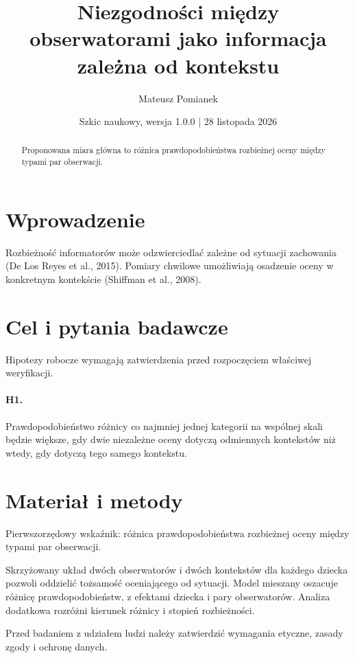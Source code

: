 \documentclass[11pt,a4paper]{article}
\title{Niezgodności między obserwatorami jako informacja zależna od kontekstu}
\author{Mateusz Pomianek}
\date{Szkic naukowy, wersja 1.0.0 | 28 listopada 2026}
\begin{document}
\maketitle

\begin{abstract}

Proponowana miara główna to różnica prawdopodobieństwa rozbieżnej oceny między typami par obserwacji.

\end{abstract}

\section{Wprowadzenie}

Rozbieżność informatorów może odzwierciedlać zależne od sytuacji zachowania (De Los Reyes et al., 2015). Pomiary chwilowe umożliwiają osadzenie oceny w konkretnym kontekście (Shiffman et al., 2008).

\section{Cel i pytania badawcze}

Hipotezy robocze wymagają zatwierdzenia przed rozpoczęciem właściwej weryfikacji.

\paragraph{H1.} Prawdopodobieństwo różnicy co najmniej jednej kategorii na wspólnej skali będzie większe, gdy dwie niezależne oceny dotyczą odmiennych kontekstów niż wtedy, gdy dotyczą tego samego kontekstu.

\section{Materiał i metody}

Pierwszorzędowy wskaźnik: różnica prawdopodobieństwa rozbieżnej oceny między typami par obserwacji.

Skrzyżowany układ dwóch obserwatorów i dwóch kontekstów dla każdego dziecka pozwoli oddzielić tożsamość oceniającego od sytuacji. Model mieszany oszacuje różnicę prawdopodobieństw, z efektami dziecka i pary obserwatorów. Analiza dodatkowa rozróżni kierunek różnicy i stopień rozbieżności.

Przed badaniem z udziałem ludzi należy zatwierdzić wymagania etyczne, zasady zgody i ochronę danych.
\end{document}
